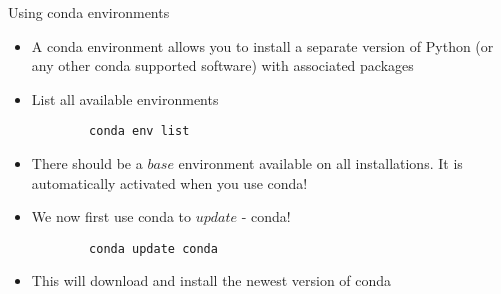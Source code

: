 \begin{frame}[fragile]{Using conda environments}

	\begin{itemize}
		\item A conda environment allows you to install a separate version of Python (or any other conda supported software) with associated packages

		\item List all available environments
		\begin{verbatim}
		conda env list
		\end{verbatim}

		\item There should be a $base$ environment available on all installations. It is automatically activated when you use conda!
		\item We now first use conda to $update$ - conda!
		\begin{verbatim}
		conda update conda
		\end{verbatim}
		\item This will download and install the newest version of conda

	\end{itemize}

\end{frame}

